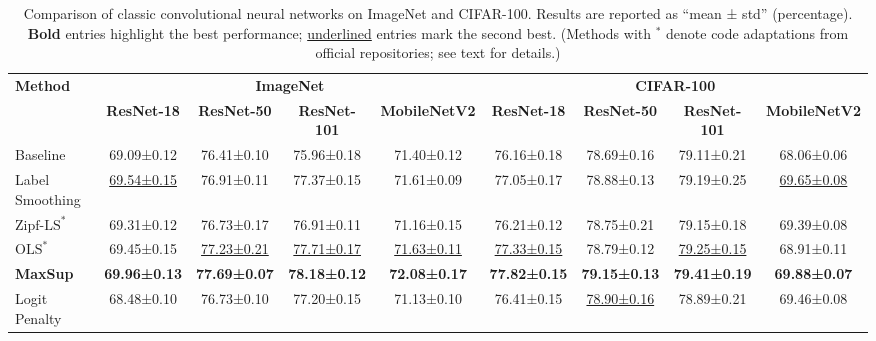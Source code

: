 \begin{table*}[htbp]
\setlength{\tabcolsep}{4pt}
\centering
\scriptsize
\caption{Comparison of classic convolutional neural networks on ImageNet and CIFAR-100.  
Results are reported as ``mean ± std'' (percentage).  
\textbf{Bold} entries highlight the best performance; \underline{underlined} entries mark the second best.  
(Methods with $^{*}$ denote code adaptations from official repositories; see text for details.)}
\vspace{-2mm}
\label{tab:comparison-new}
\begin{tabular}{@{}lcccccccc@{}}
\toprule
\textbf{Method} 
& \multicolumn{4}{c}{\textbf{ImageNet}} 
& \multicolumn{4}{c}{\textbf{CIFAR-100}} \\
\cmidrule(r){2-5}\cmidrule(l){6-9}
& \textbf{ResNet-18} & \textbf{ResNet-50} & \textbf{ResNet-101} & \textbf{MobileNetV2}
& \textbf{ResNet-18} & \textbf{ResNet-50} & \textbf{ResNet-101} & \textbf{MobileNetV2} \\
\midrule
Baseline 
& 69.09±0.12 & 76.41±0.10 & 75.96±0.18 & 71.40±0.12
& 76.16±0.18 & 78.69±0.16 & 79.11±0.21 & 68.06±0.06 \\

Label Smoothing 
& \underline{69.54±0.15} & 76.91±0.11 & 77.37±0.15 & 71.61±0.09 
& 77.05±0.17 & 78.88±0.13 & 79.19±0.25 & \underline{69.65±0.08} \\

$\text{Zipf-LS}^{*}$ 
& 69.31±0.12 & 76.73±0.17 & 76.91±0.11 & 71.16±0.15 
& 76.21±0.12 & 78.75±0.21 & 79.15±0.18 & 69.39±0.08 \\

$\text{OLS}^{*}$ 
& 69.45±0.15 & \underline{77.23±0.21} & \underline{77.71±0.17} & \underline{71.63±0.11}
& \underline{77.33±0.15} & 78.79±0.12 & \underline{79.25±0.15} & 68.91±0.11 \\

\textbf{MaxSup} 
& \textbf{69.96±0.13} & \textbf{77.69±0.07} & \textbf{78.18±0.12} & \textbf{72.08±0.17}
& \textbf{77.82±0.15} & \textbf{79.15±0.13} & \textbf{79.41±0.19} & \textbf{69.88±0.07} \\

Logit Penalty 
& 68.48±0.10 & 76.73±0.10 & 77.20±0.15 & 71.13±0.10 
& 76.41±0.15 & \underline{78.90±0.16} & 78.89±0.21 & 69.46±0.08 \\

\bottomrule
\end{tabular}
\end{table*}


